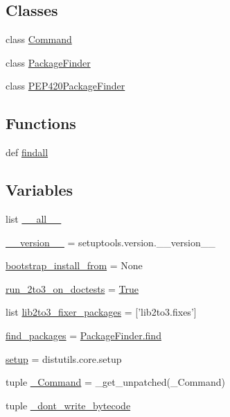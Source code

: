 \subsection*{Classes}
\begin{DoxyCompactItemize}
\item 
class \hyperlink{classsetuptools_1_1Command}{Command}
\item 
class \hyperlink{classsetuptools_1_1PackageFinder}{Package\+Finder}
\item 
class \hyperlink{classsetuptools_1_1PEP420PackageFinder}{P\+E\+P420\+Package\+Finder}
\end{DoxyCompactItemize}
\subsection*{Functions}
\begin{DoxyCompactItemize}
\item 
def \hyperlink{namespacesetuptools_a252320a52388a86c457dd880ae59e592}{findall}
\end{DoxyCompactItemize}
\subsection*{Variables}
\begin{DoxyCompactItemize}
\item 
list \hyperlink{namespacesetuptools_a4225bf1f017388e9cad84b5c0618a3b0}{\+\_\+\+\_\+all\+\_\+\+\_\+}
\item 
\hyperlink{namespacesetuptools_a032cd4f48c18d83d8bb090942751a9cc}{\+\_\+\+\_\+version\+\_\+\+\_\+} = setuptools.\+version.\+\_\+\+\_\+version\+\_\+\+\_\+
\item 
\hyperlink{namespacesetuptools_a7d51d85e64a02e0808685340753eec38}{bootstrap\+\_\+install\+\_\+from} = None
\item 
\hyperlink{namespacesetuptools_a02cbd18fe112cad981fe27383fd1ee93}{run\+\_\+2to3\+\_\+on\+\_\+doctests} = \hyperlink{libqhull_8h_add3ca9eefe3b5b754426f51d3043e579}{True}
\item 
list \hyperlink{namespacesetuptools_a2a9aa3f4107914fedf47fbf0b6c97620}{lib2to3\+\_\+fixer\+\_\+packages} = \mbox{[}'lib2to3.\+fixes'\mbox{]}
\item 
\hyperlink{namespacesetuptools_af3f752d8ed43dd0bf1640292cf7f2540}{find\+\_\+packages} = \hyperlink{classsetuptools_1_1PackageFinder_a5beee00ee08abffe24ff500f359389f7}{Package\+Finder.\+find}
\item 
\hyperlink{namespacesetuptools_a3347a1832befe1bf0e593b4c8bf7c9f8}{setup} = distutils.\+core.\+setup
\item 
tuple \hyperlink{namespacesetuptools_ae44b3e3d5d0f189812f3afdf135c6514}{\+\_\+\+Command} = \+\_\+get\+\_\+unpatched(\+\_\+\+Command)
\item 
tuple \hyperlink{namespacesetuptools_a0c8f1da9f49e958e95cadcd6a44b51c7}{\+\_\+dont\+\_\+write\+\_\+bytecode}
\end{DoxyCompactItemize}


